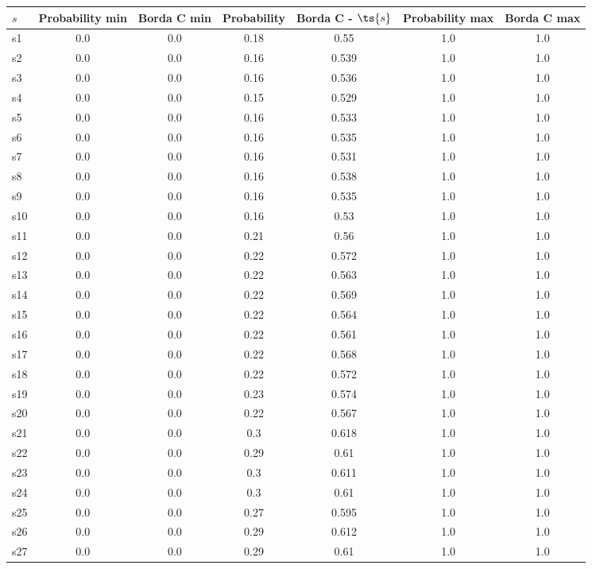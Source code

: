 \documentclass{article}
\begin{document}
\noindent\begin{tabular}{|l|c|c|c|c|c|c|}
\hline
$s$& Probability min & Borda C min & Probability & Borda C - $\ts{s}$ & Probability max & Borda C max\\
\hline
s1 &0.0 & 0.0 & 0.18 & 0.55 & 1.0 & 1.0\\
\hline
s2 &0.0 & 0.0 & 0.16 & 0.539 & 1.0 & 1.0\\
\hline
s3 &0.0 & 0.0 & 0.16 & 0.536 & 1.0 & 1.0\\
\hline
s4 &0.0 & 0.0 & 0.15 & 0.529 & 1.0 & 1.0\\
\hline
s5 &0.0 & 0.0 & 0.16 & 0.533 & 1.0 & 1.0\\
\hline
s6 &0.0 & 0.0 & 0.16 & 0.535 & 1.0 & 1.0\\
\hline
s7 &0.0 & 0.0 & 0.16 & 0.531 & 1.0 & 1.0\\
\hline
s8 &0.0 & 0.0 & 0.16 & 0.538 & 1.0 & 1.0\\
\hline
s9 &0.0 & 0.0 & 0.16 & 0.535 & 1.0 & 1.0\\
\hline
s10 &0.0 & 0.0 & 0.16 & 0.53 & 1.0 & 1.0\\
\hline
s11 &0.0 & 0.0 & 0.21 & 0.56 & 1.0 & 1.0\\
\hline
s12 &0.0 & 0.0 & 0.22 & 0.572 & 1.0 & 1.0\\
\hline
s13 &0.0 & 0.0 & 0.22 & 0.563 & 1.0 & 1.0\\
\hline
s14 &0.0 & 0.0 & 0.22 & 0.569 & 1.0 & 1.0\\
\hline
s15 &0.0 & 0.0 & 0.22 & 0.564 & 1.0 & 1.0\\
\hline
s16 &0.0 & 0.0 & 0.22 & 0.561 & 1.0 & 1.0\\
\hline
s17 &0.0 & 0.0 & 0.22 & 0.568 & 1.0 & 1.0\\
\hline
s18 &0.0 & 0.0 & 0.22 & 0.572 & 1.0 & 1.0\\
\hline
s19 &0.0 & 0.0 & 0.23 & 0.574 & 1.0 & 1.0\\
\hline
s20 &0.0 & 0.0 & 0.22 & 0.567 & 1.0 & 1.0\\
\hline
s21 &0.0 & 0.0 & 0.3 & 0.618 & 1.0 & 1.0\\
\hline
s22 &0.0 & 0.0 & 0.29 & 0.61 & 1.0 & 1.0\\
\hline
s23 &0.0 & 0.0 & 0.3 & 0.611 & 1.0 & 1.0\\
\hline
s24 &0.0 & 0.0 & 0.3 & 0.61 & 1.0 & 1.0\\
\hline
s25 &0.0 & 0.0 & 0.27 & 0.595 & 1.0 & 1.0\\
\hline
s26 &0.0 & 0.0 & 0.29 & 0.612 & 1.0 & 1.0\\
\hline
s27 &0.0 & 0.0 & 0.29 & 0.61 & 1.0 & 1.0\\

\end{tabular}
\end{document}
